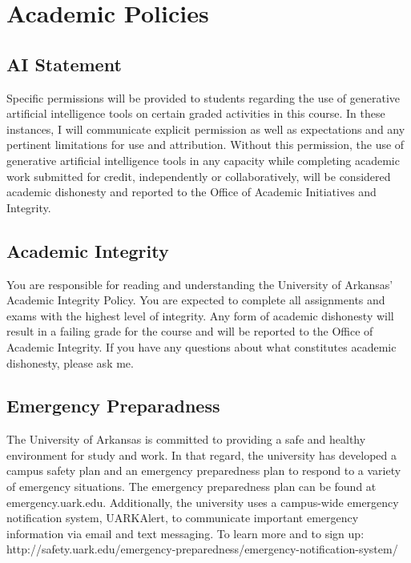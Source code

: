 \documentclass[
  letterpaper,
  DIV=11,
  numbers=noendperiod]{scrartcl}
\begin{document}
\hypertarget{academic-policies}{%
\section{Academic Policies}\label{academic-policies}}

\hypertarget{ai-statement}{%
\subsection{AI Statement}\label{ai-statement}}

Specific permissions will be provided to students regarding the use of
generative artificial intelligence tools on certain graded activities in
this course. In these instances, I will communicate explicit permission
as well as expectations and any pertinent limitations for use and
attribution. Without this permission, the use of generative artificial
intelligence tools in any capacity while completing academic work
submitted for credit, independently or collaboratively, will be
considered academic dishonesty and reported to the Office of Academic
Initiatives and Integrity.

\hypertarget{academic-integrity}{%
\subsection{Academic Integrity}\label{academic-integrity}}

You are responsible for reading and understanding the University of
Arkansas' Academic Integrity Policy. You are expected to complete all
assignments and exams with the highest level of integrity. Any form of
academic dishonesty will result in a failing grade for the course and
will be reported to the Office of Academic Integrity. If you have any
questions about what constitutes academic dishonesty, please ask me.

\hypertarget{emergency-preparadness}{%
\subsection{Emergency Preparadness}\label{emergency-preparadness}}

The University of Arkansas is committed to providing a safe and healthy
environment for study and work. In that regard, the university has
developed a campus safety plan and an emergency preparedness plan to
respond to a variety of emergency situations. The emergency preparedness
plan can be found at emergency.uark.edu. Additionally, the university
uses a campus-wide emergency notification system, UARKAlert, to
communicate important emergency information via email and text
messaging. To learn more and to sign up:
http://safety.uark.edu/emergency-preparedness/emergency-notification-system/
\end{document}
